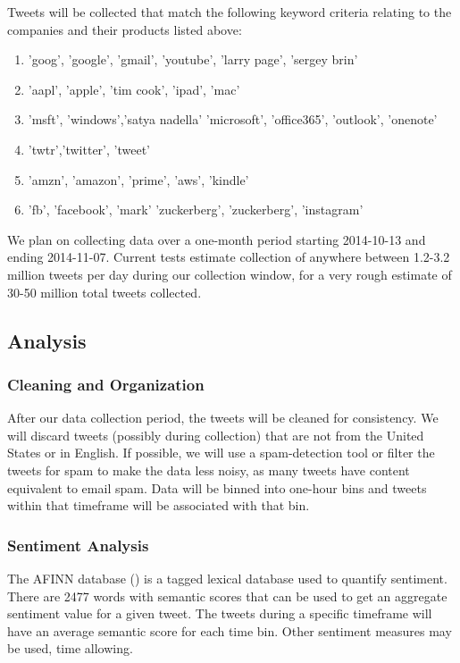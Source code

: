 \documentclass[titlepage]{article}\usepackage[]{graphicx}\usepackage[]{color}
\begin{document}
Tweets will be collected that match the following keyword criteria relating to the
companies and their products listed above:
\begin{enumerate}
  \item 'goog', 'google', 'gmail', 'youtube', 'larry page', 'sergey brin'
  \item 'aapl', 'apple', 'tim cook', 'ipad', 'mac'
  \item 'msft', 'windows','satya nadella' 'microsoft', 'office365', 'outlook', 'onenote'
  \item 'twtr','twitter', 'tweet'
  \item 'amzn', 'amazon', 'prime', 'aws', 'kindle'
  \item 'fb', 'facebook', 'mark' 'zuckerberg', 'zuckerberg', 'instagram'
\end{enumerate}

We plan on collecting data over a one-month period starting 2014-10-13 and
ending 2014-11-07.  Current tests estimate collection of anywhere between
1.2-3.2 million tweets per day during our collection window, for a very rough
estimate of 30-50 million total tweets collected.  

\subsection{Analysis}

\subsubsection{Cleaning and Organization}
After our data collection period, the tweets will be cleaned for consistency.
We will discard tweets (possibly during collection) that are not from the
United States or in English. If possible, we will use a 
spam-detection tool or filter the tweets for spam to make the data less noisy,
as many tweets have content equivalent to email spam.
Data will be binned into one-hour bins and tweets within that timeframe will be
associated with that bin. 

\subsubsection{Sentiment Analysis}
The AFINN database (\cite{ANEW}) is a tagged lexical database used to quantify sentiment.
There are 2477 words with semantic scores that can be used to get an aggregate
sentiment value for a given tweet. The tweets during a specific timeframe will
have an average semantic score for each time bin. Other sentiment measures may
be used, time allowing. 
\end{document}
